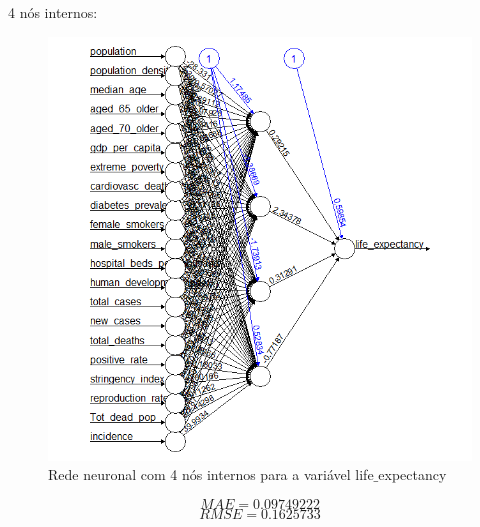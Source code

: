 \documentclass[conference]{IEEEtran}
\begin{document}
4 nós internos:
\begin{figure}[htbp]
\centerline{\includegraphics[width=0.95\columnwidth]{images/04_4.png}}
\caption{Rede neuronal com 4 nós internos para a variável life$\_$expectancy}
\label{4b}
\end{figure}
\begin{equation}
MAE=0.09749222\label{4c2_mae}
\end{equation}
\begin{equation}
RMSE=0.1625733\label{4c2_rmse}
\end{equation}
\end{document}
